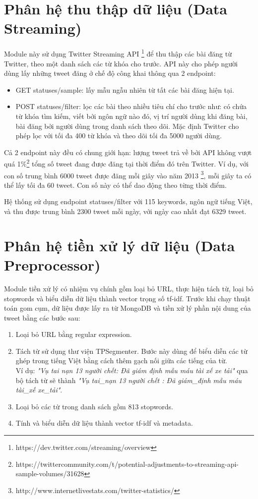 \section{Phân hệ thu thập dữ liệu (Data Streaming)}
Module này sử dụng Twitter Streaming API \footnote{https://dev.twitter.com/streaming/overview} để thu thập các bài đăng từ Twitter, theo một danh sách các từ khóa cho trước. API này cho phép người dùng lấy những tweet đăng ở chế độ công khai thông qua 2 endpoint:
	\begin{itemize}
		\item GET statuses/sample: lấy mẫu ngẫu nhiên từ tất các bài đăng hiện tại.
		\item POST statuses/filter: lọc các bài theo nhiều tiêu chí cho trước như: có chứa từ khóa tìm kiếm, viết bởi ngôn ngữ nào đó, vị trí người dùng khi đăng bài, bài đăng bởi người dùng trong danh sách theo dõi. Mặc định Twitter cho phép lọc với tối đa 400 từ khóa và theo dõi tối đa 5000 người dùng.
	\end{itemize}
Cả 2 endpoint này đều có chung giới hạn: lượng tweet trả về bởi API không vượt quá 1\%\footnote{https://twittercommunity.com/t/potential-adjustments-to-streaming-api-sample-volumes/31628} tổng số tweet đang được đăng tại thời điểm đó trên Twitter. Ví dụ, với con số trung bình 6000 tweet được đăng mỗi giây vào năm 2013 \footnote{http://www.internetlivestats.com/twitter-statistics/}, mỗi giây ta có thể lấy tối đa 60 tweet. Con số này có thể dao động theo từng thời điểm.

Hệ thống sử dụng endpoint statuses/filter với 115 keywords, ngôn ngữ tiếng Việt, và thu được trung bình 2300 tweet mỗi ngày, với ngày cao nhất đạt 6329 tweet. 

\section{Phân hệ tiền xử lý dữ liệu (Data Preprocessor)}
Module tiền xử lý có nhiệm vụ chính gồm loại bỏ URL, thực hiện tách từ, loại bỏ stopwords và biểu diễn dữ liệu thành vector trọng số tf-idf. Trước khi chạy thuật toán gom cụm, dữ liệu được lấy ra từ MongoDB và tiền xử lý phần nội dung của tweet bằng các bước sau:
	\begin{enumerate}
		\item Loại bỏ URL bằng regular expression.
		\item Tách từ sử dụng thư viện TPSegmenter. Bước này dùng để biểu diễn các từ ghép trong tiếng Việt bằng cách thêm gạch nối giữa các tiếng của từ.\\
		Ví dụ: \textit{"Vụ tai nạn 13 người chết: Đã giám định mẫu máu tài xế xe tải"} qua bộ tách từ sẽ thành \textit{"Vụ tai\_nạn 13 người chết : Đã giám\_định mẫu máu tài\_xế xe\_tải"}.
		\item Loại bỏ các từ trong danh sách gồm 813 stopwords.
		\item Tính và biểu diễn dữ liệu thành vector tf-idf và metadata.
	\end{enumerate}

